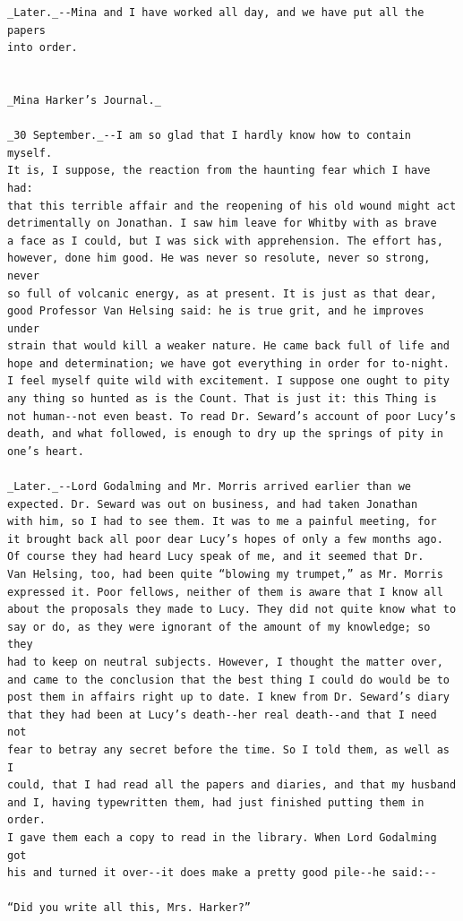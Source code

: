 \documentclass{article}
\begin{document}
\begin{verbatim}
_Later._--Mina and I have worked all day, and we have put all the papers
into order.


_Mina Harker’s Journal._

_30 September._--I am so glad that I hardly know how to contain myself.
It is, I suppose, the reaction from the haunting fear which I have had:
that this terrible affair and the reopening of his old wound might act
detrimentally on Jonathan. I saw him leave for Whitby with as brave
a face as I could, but I was sick with apprehension. The effort has,
however, done him good. He was never so resolute, never so strong, never
so full of volcanic energy, as at present. It is just as that dear,
good Professor Van Helsing said: he is true grit, and he improves under
strain that would kill a weaker nature. He came back full of life and
hope and determination; we have got everything in order for to-night.
I feel myself quite wild with excitement. I suppose one ought to pity
any thing so hunted as is the Count. That is just it: this Thing is
not human--not even beast. To read Dr. Seward’s account of poor Lucy’s
death, and what followed, is enough to dry up the springs of pity in
one’s heart.

_Later._--Lord Godalming and Mr. Morris arrived earlier than we
expected. Dr. Seward was out on business, and had taken Jonathan
with him, so I had to see them. It was to me a painful meeting, for
it brought back all poor dear Lucy’s hopes of only a few months ago.
Of course they had heard Lucy speak of me, and it seemed that Dr.
Van Helsing, too, had been quite “blowing my trumpet,” as Mr. Morris
expressed it. Poor fellows, neither of them is aware that I know all
about the proposals they made to Lucy. They did not quite know what to
say or do, as they were ignorant of the amount of my knowledge; so they
had to keep on neutral subjects. However, I thought the matter over,
and came to the conclusion that the best thing I could do would be to
post them in affairs right up to date. I knew from Dr. Seward’s diary
that they had been at Lucy’s death--her real death--and that I need not
fear to betray any secret before the time. So I told them, as well as I
could, that I had read all the papers and diaries, and that my husband
and I, having typewritten them, had just finished putting them in order.
I gave them each a copy to read in the library. When Lord Godalming got
his and turned it over--it does make a pretty good pile--he said:--

“Did you write all this, Mrs. Harker?”


\end{verbatim}
\end{document}
